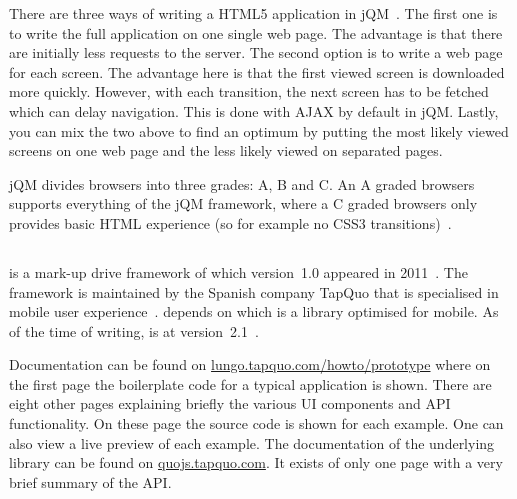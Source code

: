 \documentclass[a4paper]{artikel3}
\newcommand{\term}[1]{\emph{#1}}
\newcommand{\exturl}[1]{\href{http://#1}{#1}}
\newcommand{\setspace}[0]{\vspace{2mm}}
\renewcommand{\paragraph}[1]{\setspace \noindent {\bf #1}  }
\begin{document}
There are three ways of writing a HTML5 application in jQM~\cite{Broulik2012}. 
The first one is to write the full application on one single web page.
The advantage is that there are initially less requests to the server.
The second option is to write a web page for each screen. 
The advantage here is that the first viewed screen is downloaded more quickly. 
However, with each transition, the next screen has to be fetched which can delay navigation.
This is done with AJAX by default in jQM.
Lastly, you can mix the two above to find an optimum by putting the most likely viewed screens on one web page and the less likely viewed on separated pages.  

\paragraph{Browser support}
\label{sec:jqm-browser-support}
jQM divides browsers into three grades: A, B and C. 
An A graded browsers supports everything of the jQM framework, where a C graded browsers only provides basic HTML experience (so for example no CSS3 transitions)~\cite{JQuery2012d}.


\subsection{\lungo} %
\label{sec:frameworks-lungo}

\lungo{} is a mark-up drive framework of which version~1.0 appeared in 2011~\cite{TapQuo2011}.
The framework is maintained by the Spanish company TapQuo that is specialised in mobile user experience~\cite{TapQuo2013a}.
\lungo{} depends on  \quo{} which is a \js{} library optimised for mobile.
As of the time of writing, \lungo{} is at version~2.1~\cite{TapQuo2013}.

\paragraph{Documentation}
Documentation can be found on \exturl{lungo.tapquo.com/howto/prototype} where on the first page the boilerplate code for a typical \lungo{} application is shown.
There are eight other pages explaining briefly the various UI components and API functionality.
On these page the source code is shown for each example.
One can also view a live preview of each example.
The documentation of the underlying \js{} library can be found on \exturl{quojs.tapquo.com}.
It exists of only one page with a very brief summary of the API.
\end{document}
